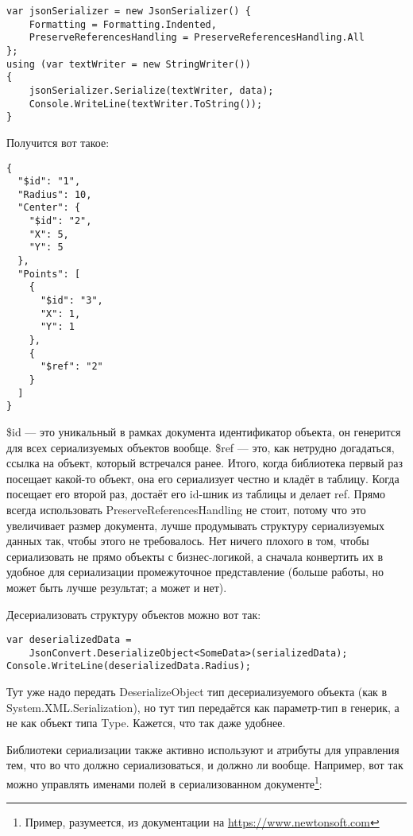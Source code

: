\documentclass[a5paper]{article}
\begin{document}
\begin{verbatim}
var jsonSerializer = new JsonSerializer() {
    Formatting = Formatting.Indented,
    PreserveReferencesHandling = PreserveReferencesHandling.All
};
using (var textWriter = new StringWriter())
{
    jsonSerializer.Serialize(textWriter, data);
    Console.WriteLine(textWriter.ToString());
}
\end{verbatim}

Получится вот такое:

\begin{verbatim}
{
  "$id": "1",
  "Radius": 10,
  "Center": {
    "$id": "2",
    "X": 5,
    "Y": 5
  },
  "Points": [
    {
      "$id": "3",
      "X": 1,
      "Y": 1
    },
    {
      "$ref": "2"
    }
  ]
}
 \end{verbatim}

\$id --- это уникальный в рамках документа идентификатор объекта, он генерится для всех сериализуемых объектов вообще. \$ref --- это, как нетрудно догадаться, ссылка на объект, который встречался ранее. Итого, когда библиотека первый раз посещает какой-то объект, она его сериализует честно и кладёт в таблицу. Когда посещает его второй раз, достаёт его id-шник из таблицы и делает ref. Прямо всегда использовать PreserveReferencesHandling не стоит, потому что это увеличивает размер документа, лучше продумывать структуру сериализуемых данных так, чтобы этого не требовалось. Нет ничего плохого в том, чтобы сериализовать не прямо объекты с бизнес-логикой, а сначала конвертить их в удобное для сериализации промежуточное представление (больше работы, но может быть лучше результат; а может и нет).

Десериализовать структуру объектов можно  вот так:

\begin{verbatim}
var deserializedData = 
    JsonConvert.DeserializeObject<SomeData>(serializedData);
Console.WriteLine(deserializedData.Radius);
\end{verbatim}

Тут уже надо передать DeserializeObject тип десериализуемого объекта (как в System.XML.Serialization), но тут тип передаётся как параметр-тип в генерик, а не как объект типа Type. Кажется, что так даже удобнее.

Библиотеки сериализации также активно используют и атрибуты для управления тем, что во что должно сериализоваться, и должно ли вообще. Например, вот так можно управлять именами полей в сериализованном документе\footnote{Пример, разумеется, из документации на \url{https://www.newtonsoft.com}}:
\end{document}
